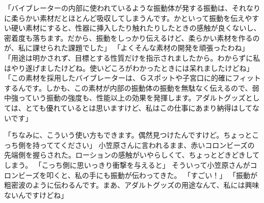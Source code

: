 「バイブレーターの内部に使われているような振動体が発する振動は、それなりに柔らかい素材だとほとんど吸収してしまうんです。かといって振動を伝えやすい硬い素材にすると、性器に挿入したり触れたりしたときの感触が良くないし、密着度も落ちます。だから、振動をしっかり伝えるけど、柔らかい素材を作るのが、私に課せられた課題でした」
「よくそんな素材の開発を頑張ったわね」
「用途は明かされず、目標とする性質だけを指示されましたから。わからずに私はやり遂げましたけどね。使いどころがわかったときには呆れましたけどね」
「この素材を採用したバイブレーターは、Ｇスポットや子宮口に的確にフィットするんです。しかも、この素材が内部の振動体の振動を無駄なく伝えるので、弱中強っていう振動の強度も、性能以上の効果を発揮します。アダルトグッズとしては、とても優れているとは思いますけど、私はこの仕事にあまり納得はしてないです」

「ちなみに、こういう使い方もできます。偶然見つけたんですけど。ちょっとこっち側を持っててください」
小笠原さんに言われるまま、赤いコロンビーズの先端側を握らされた。ローションの感触がいやらしくて、ちょっとどきどきしてしまう。
「こっち側に思いっきり衝撃を与えると」
そういって小笠原さんがコロンビーズを叩くと、私の手にも振動が伝わってきた。
「すごい！」
「振動が粗密波のように伝わるんです。まあ、アダルトグッズの用途なんて、私には興味ないんですけどね」




